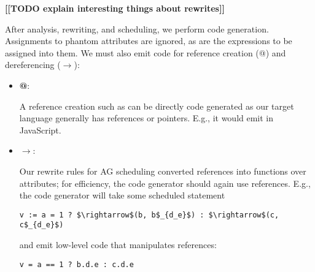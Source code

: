 \textbf{[[TODO explain interesting things about rewrites]]}

After analysis, rewriting, and scheduling, we perform code generation. Assignments to phantom attributes are ignored, as are the expressions to be assigned into them. We must also emit code for reference creation (@) and dereferencing ($\rightarrow$):

\begin{itemize}
\item \textbf{@}: 

A reference creation such as  can be directly code generated as our target language generally has references or pointers. E.g., it would emit  in JavaScript.

\item \textbf{$\rightarrow$}:

Our rewrite rules for AG scheduling converted references into functions over attributes; for efficiency, the code generator should again use references. E.g., the code generator will take some scheduled statement

\begin{lstlisting}[mathescape]
v := a = 1 ? $\rightarrow$(b, b$_{d_e}$) : $\rightarrow$(c, c$_{d_e}$)
\end{lstlisting}

and emit low-level code that manipulates references:

\begin{lstlisting}[mathescape]
v = a == 1 ? b.d.e : c.d.e
\end{lstlisting}
\end{itemize}


